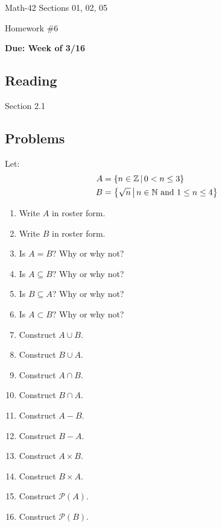 \documentclass[letterpaper,12pt,fleqn]{article}
\renewcommand{\P}{\mathcal{P}}
\begin{document}
\begin{center}
  \large
  Math-42 Sections 01, 02, 05

  \Large
  Homework \#6

  \large
  \textbf{Due: Week of 3/16}
\end{center}

\subsection*{Reading}

Section 2.1

\subsection*{Problems}

Let:
\begin{align*}
  A &= \left\{{n\in\mathbb{Z}}\,\middle|\,{0<n\le3}\right\} \\
  B &= \left\{{\sqrt{n}}\,\middle|\,{n\in\mathbb{N}\ \text{and}\ 1\le n\le 4}\right\}
\end{align*}

\begin{enumerate}[left=0in]
\item Write \(A\) in roster form.
\item Write \(B\) in roster form.
\item Is \(A=B\)?  Why or why not?
\item Is \(A\subseteq B\)? Why or why not?
\item Is \(B\subseteq A\)? Why or why not?
\item Is \(A\subset B\)? Why or why not?
\item Construct \(A\cup B\).
\item Construct \(B\cup A\).
\item Construct \(A\cap B\).
\item Construct \(B\cap A\).
\item Construct \(A-B\).
\item Construct \(B-A\).
\item Construct \(A\times B\).
\item Construct \(B\times A\).
\item Construct \(\P(A)\).
\item Construct \(\P(B)\).
\end{enumerate}
\end{document}
